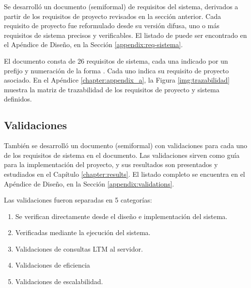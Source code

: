 Se desarrolló un documento (semiformal) de requisitos del sistema, derivados a partir de los requisitos de proyecto revisados en la sección anterior. Cada requisito de proyecto fue reformulado desde su versión difusa, uno o más requisitos de sistema precisos y verificables. El listado de puede ser encontrado en el Apéndice de Diseño, en la Sección \ref{appendix:req-sistema}.

El documento consta de 26 requisitos de sistema, cada una indicado por un prefijo y numeración de la forma . Cada uno indica su requisito de proyecto asociado. En el Apéndice \ref{chapter:appendix_a}, la Figura \ref{img:trazabilidad} muestra la matriz de trazabilidad de los requisitos de proyecto y sistema definidos.

\subsection{Validaciones}

También se desarrolló un documento (semiformal) con validaciones para cada uno de los requisitos de sistema en el documento. Las validaciones sirven como guía para la implementación del proyecto, y sus resultados son presentados y estudiados en el Capítulo \ref{chapter:results}. El listado completo se encuentra en el Apéndice de Diseño, en la Sección \ref{appendix:validations}.

Las validaciones fueron separadas en 5 categorías: 
\begin{enumerate}
	\item {} Se verifican directamente desde el diseño e implementación del sistema.
	\item {} Verificadas mediante la ejecución del sistema.
	\item {} Validaciones de consultas LTM al servidor.
	\item {} Validaciones de eficiencia
	\item {} Validaciones de escalabilidad.
\end{enumerate}

